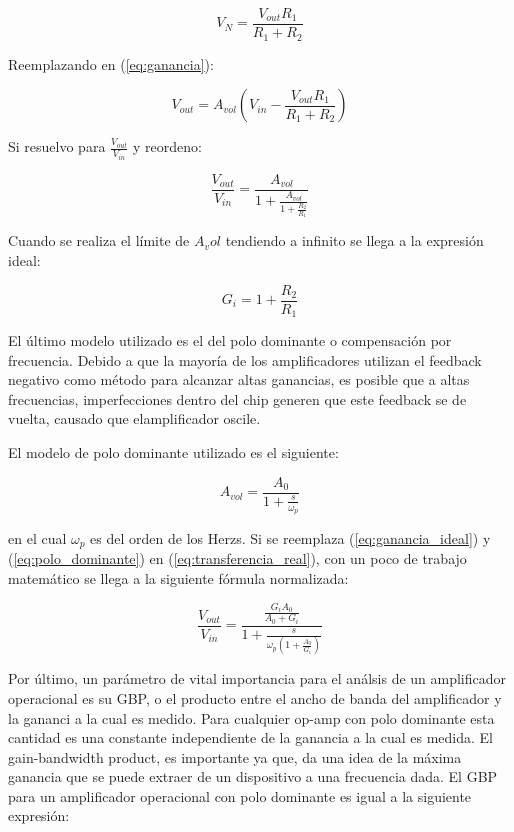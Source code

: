 \begin{equation}
V_N = \frac{V_{out}R_1}{R_1 + R_2}
\end{equation}

Reemplazando en (\ref{eq:ganancia}):

\begin{equation}
V_{out} = A_{vol}(V_{in} - \frac{V_{out}R_1}{R_1 + R_2})
\end{equation}

Si resuelvo para $\frac{V_{out}}{V_{in}}$ y reordeno:

\begin{equation}\label{eq:transferencia_real}
\frac{V_{out}}{V_{in}} = \frac{A_{vol}}{1 + \frac{A_{vol}}{1 + \frac{R_2}{R_1}}}
\end{equation}

Cuando se realiza el límite de $A_vol$ tendiendo a infinito se llega a la expresión ideal:

\begin{equation}\label{eq:ganancia_ideal}
G_i = 1 + \frac{R_2}{R_1}
\end{equation}

El último modelo utilizado es el del polo dominante o compensación por frecuencia. Debido a que la mayoría de los amplificadores utilizan el feedback negativo como método para alcanzar altas ganancias, es posible que a altas frecuencias, imperfecciones dentro del chip generen que este feedback se de vuelta, causado que elamplificador oscile. 


El modelo de polo dominante utilizado es el siguiente:

\begin{equation}\label{eq:polo_dominante}
A_{vol} = \frac{A_0}{1 + \frac{s}{\omega_p}}
\end{equation}

en el cual $\omega_p$ es del orden de los Herzs.
Si se reemplaza (\ref{eq:ganancia_ideal}) y (\ref{eq:polo_dominante}) en (\ref{eq:transferencia_real}), con un poco de trabajo matemático se llega a la siguiente fórmula normalizada:

\begin{equation}\label{eq:ganancia_completa_normalizada}
\frac{V_{out}}{V_{in}} = \frac{\frac{G_iA_0}{A_0 + G_i}}{1 + \frac{s}{\omega_p(1 + \frac{A_0}{G_i})}}
\end{equation}

Por último, un parámetro de vital importancia para el análsis de un amplificador operacional es su GBP, o el producto entre el ancho de banda del amplificador y la gananci a la cual es medido. Para cualquier op-amp con polo dominante esta cantidad es una constante independiente de la ganancia a la cual es medida. El gain-bandwidth product, es importante ya que, da una idea de la máxima ganancia que se puede extraer de un dispositivo a una frecuencia dada. El GBP para un amplificador operacional con polo dominante es igual a la siguiente expresión:

